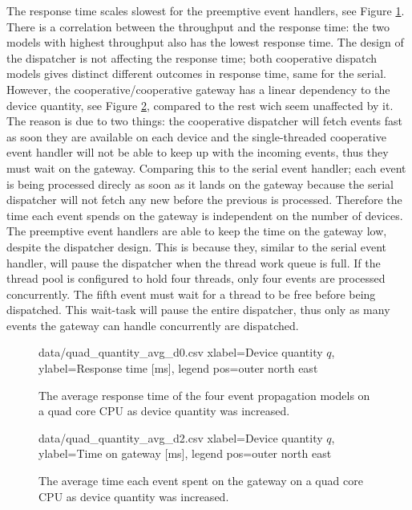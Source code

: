 The response time scales slowest for the preemptive event handlers, see Figure
\ref{fig:quad_quantity_avg_d0}. There is a correlation between the throughput
and the response time: the two models with highest throughput also has the
lowest response time. The design of the dispatcher is not affecting the
response time; both cooperative dispatch models gives distinct different
outcomes in response time, same for the serial. However, the
cooperative/cooperative gateway has a linear dependency to the device quantity,
see Figure \ref{fig:quad_quantity_avg_d2}, compared to the rest wich seem
unaffected by it. The reason is due to two things: the cooperative dispatcher
will fetch events fast as soon they are available on each device and the
single-threaded cooperative event handler will not be able to keep up with the
incoming events, thus they must wait on the gateway. Comparing this to the
serial event handler; each event is being processed direcly as soon as it lands
on the gateway because the serial dispatcher will not fetch any new before the
previous is processed. Therefore the time each event spends on the gateway is
independent on the number of devices. The preemptive event handlers are able to
keep the time on the gateway low, despite the dispatcher design. This is
because they, similar to the serial event handler, will pause the dispatcher
when the thread work queue is full. If the thread pool is configured to hold
four threads, only four events are processed concurrently. The fifth event must
wait for a thread to be free before being dispatched. This wait-task will pause
the entire dispatcher, thus only as many events the gateway can handle
concurrently are dispatched.

\begin{figure}[h!]
    \centering
    \performanceplot
    {data/quad_quantity_avg_d0.csv}
    {
        xlabel=Device quantity $q$,
        ylabel={Response time [ms]},
        legend pos=outer north east
    }

    \caption[Response time result when device quantity was increased.]{The
    average response time of the four event propagation models on a quad core
    CPU as device quantity was increased.}

    \label{fig:quad_quantity_avg_d0}
\end{figure}

\begin{figure}[h!]
    \centering
    \performanceplot
    {data/quad_quantity_avg_d2.csv}
    {
        xlabel=Device quantity $q$,
        ylabel={Time on gateway [ms]},
        legend pos=outer north east
    }

    \caption[Time spent on gateway when device quantity was increased.]{The
    average time each event spent on the gateway on a quad core CPU as device
    quantity was increased.}

    \label{fig:quad_quantity_avg_d2}
\end{figure}

